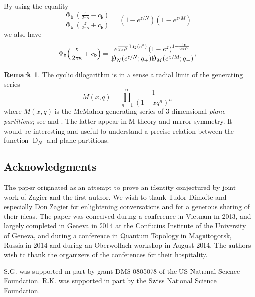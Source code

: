 \documentclass[12pt]{amsart}
\theoremstyle{definition}
\newtheorem{remark}[theorem]{Remark}
\newcommand{\im}{\mathsf{i}}
\newcommand{\fad}[1]{\operatorname{\Phi}_{#1}}
\begin{document}
By using the equality
\begin{equation}
\frac{\fad{\mathsf{b}}\!\left(\frac{z}{2\pi\mathsf{s}}-c_{\mathsf{b}}\right)}
{\fad{\mathsf{b}}\!\left(\frac{z}{2\pi\mathsf{s}}+c_{\mathsf{b}}\right)}=
\left(1-e^{z/N}\right)\left(1-e^{z/M}\right)
\end{equation}
we also have
\begin{equation}\label{eq.Phieval+}
\fad{\mathsf{b}}\!\left(\frac{z}{2\pi\mathsf{s}}+c_{\mathsf{b}}\right)=
\frac{e^{\frac{\im}{2\pi\mathsf{s}^2}\operatorname{Li_2}(e^{z})}
\left(1-e^z\right)^{1+\frac{\im z}{2\pi\mathsf{s}^2}}}{
\slashed{\operatorname{D}}_N(e^{z/N};q_+)
\slashed{\operatorname{D}}_M(e^{z/M};q_-)},
\end{equation}

\begin{remark}
\label{rem.ORV}
The cyclic dilogarithm is in a sense a radial limit of the generating series
$$
M(x,q)=\prod_{n=1}^\infty \frac{1}{(1-x q^n)^n}
$$
where $M(x,q)$ is the McMahon generating series of 3-dimensional
{\em plane partitions}; see \cite{top-vertex} and \cite[Sec.2.1]{ORV}. 
The latter appear in M-theory and mirror symmetry. It would be
interesting and useful to understand a precise relation between 
the function $\operatorname{D}_N$ and plane partitions. 
\end{remark}

\subsection*{Acknowledgments}
The paper originated as an attempt to prove an identity conjectured by
joint work of Zagier and the first author. We wish to thank Tudor Dimofte
and especially Don Zagier for enlightening conversations and for a 
generous sharing of their ideas. The paper was conceived during a conference 
in Vietnam in 2013, and largely completed in Geneva in 2014 at the Confucius 
Institute of the University of Geneva, and during a conference in Quantum 
Topology in Magnitogorsk, Russia in 2014 and during an Oberwolfach workshop 
in August 2014. The authors wish to thank the organizers of the conferences 
for their hospitality.

S.G. was supported in part by grant DMS-0805078 of the US National Science 
Foundation. R.K. was supported in part by the Swiss National Science Foundation.

\end{document}
